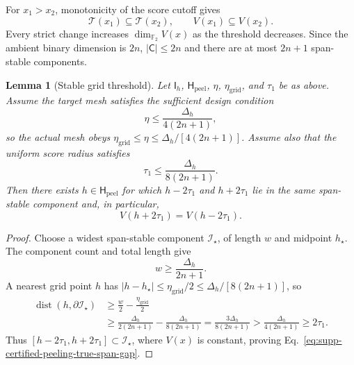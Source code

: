\documentclass[
  aps,
  prx,
  reprint,
  superscriptaddress,
  amsmath,
  amssymb,
  nofootinbib,
  longbibliography
]{revtex4-2}
\newtheorem{lemma}[theorem]{Lemma}
\newcommand{\Fc}{\mathbb{F}_2}
\begin{document}
For $x_1>x_2$, monotonicity of the score cutoff gives
\begin{equation}
\mathcal T(x_1)\subseteq\mathcal T(x_2),
\qquad
V(x_1)\subseteq V(x_2).
\label{eq:supp-high-score-span-monotonicity}
\end{equation}
Every strict change increases $\dim_{\Fc}V(x)$ as the threshold decreases.
Since the ambient binary dimension is $2n$, $|\mathsf C|\le2n$ and there
are at most $2n+1$ span-stable components.

\begin{lemma}[Stable grid threshold]
\label{lem:supp-stable-grid-threshold}
Let $\mathsf I_h$, $\mathsf H_{\mathrm{peel}}$, $\eta$,
$\eta_{\mathrm{grid}}$, and $\tau_1$ be as above.
Assume the target mesh satisfies the sufficient design condition
\begin{equation}
\eta
\le
\frac{\Delta_h}{4(2n+1)},
\label{eq:supp-certified-peeling-grid-condition}
\end{equation}
so the actual mesh obeys
$\eta_{\mathrm{grid}}\le\eta\le \Delta_h/[4(2n+1)]$.  Assume also that the uniform
score radius satisfies
\begin{equation}
\tau_1
\le
\frac{\Delta_h}{8(2n+1)}.
\label{eq:supp-certified-peeling-tau-condition}
\end{equation}
Then there exists $h\in\mathsf H_{\mathrm{peel}}$ for which
$h-2\tau_1$ and $h+2\tau_1$ lie in the same span-stable component and,
in particular,
\begin{equation}
V(h+2\tau_1)
=
V(h-2\tau_1).
\label{eq:supp-certified-peeling-true-span-gap}
\end{equation}
\end{lemma}

\begin{proof}
Choose a widest span-stable component $\mathcal I_\star$, of length $w$
and midpoint $h_\star$.  The component count and total length give
\begin{equation}
w
\ge
\frac{\Delta_h}{2n+1}.
\label{eq:supp-required-span-stable-width}
\end{equation}
A nearest grid point $h$ has
$|h-h_\star|\le\eta_{\mathrm{grid}}/2
\le\Delta_h/[8(2n+1)]$, so
\begin{equation}
\begin{aligned}
\operatorname{dist}(h,\partial\mathcal I_\star)
&\ge
\frac{w}{2}-\frac{\eta_{\mathrm{grid}}}{2}
\\
&\ge
\frac{\Delta_h}{2(2n+1)}-\frac{\Delta_h}{8(2n+1)}
=
\frac{3\Delta_h}{8(2n+1)}
>
\frac{\Delta_h}{4(2n+1)}
\ge
2\tau_1.
\end{aligned}
\end{equation}
Thus $[h-2\tau_1,h+2\tau_1]\subset\mathcal I_\star$, where $V(x)$ is
constant, proving Eq.~\eqref{eq:supp-certified-peeling-true-span-gap}.
\end{proof}
\end{document}
